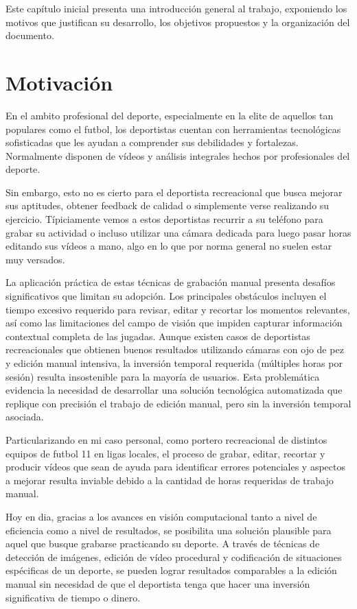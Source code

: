 Este capítulo inicial presenta una introducción general al trabajo, exponiendo los motivos que justifican su desarrollo, los objetivos propuestos y la organización del documento.

\section[Motivación]{Motivación}
En el ambito profesional del deporte, especialmente en la elite de aquellos tan populares como el futbol, los deportistas cuentan con herramientas tecnológicas sofisticadas que les ayudan a comprender sus debilidades y fortalezas. Normalmente disponen de vídeos y 
análisis integrales hechos por profesionales del deporte.

Sin embargo, esto no es cierto para el deportista recreacional que busca mejorar sus aptitudes, obtener feedback de calidad o simplemente verse realizando su ejercicio. Típiciamente vemos a estos deportistas recurrir a su teléfono para grabar su actividad o incluso utilizar una cámara dedicada para luego pasar horas editando sus vídeos a mano, algo en lo que por norma general no suelen estar muy versados.

La aplicación práctica de estas técnicas de grabación manual presenta desafíos significativos que limitan su adopción. Los principales obstáculos incluyen el tiempo excesivo requerido para revisar, editar y recortar los momentos relevantes, así como las limitaciones del campo de visión que impiden capturar información contextual completa de las jugadas. Aunque existen casos de deportistas recreacionales que obtienen buenos resultados utilizando cámaras con ojo de pez y edición manual intensiva, la inversión temporal requerida (múltiples horas por sesión) resulta insostenible para la mayoría de usuarios. Esta problemática evidencia la necesidad de desarrollar una solución tecnológica automatizada que replique con precisión el trabajo de edición manual, pero sin la inversión temporal asociada.

Particularizando en mi caso personal, como portero recreacional de distintos equipos de futbol 11 en ligas locales, el proceso de grabar, editar, recortar y producir vídeos que sean de ayuda para identificar errores potenciales y aspectos a mejorar resulta inviable debido a la cantidad de horas requeridas de trabajo manual.

Hoy en dia, gracias a los avances en visión computacional tanto a nivel de eficiencia como a nivel de resultados, se posibilita una solución plausible para aquel que busque grabarse practicando su deporte. A través de técnicas de detección de imágenes, edición de vídeo procedural y codificación de situaciones espécificas de un deporte, se pueden lograr resultados comparables a la edición manual sin necesidad de que el deportista tenga que hacer una inversión significativa de tiempo o dinero.

